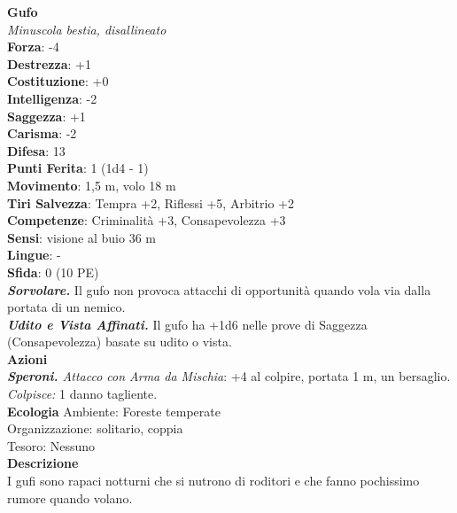 \begin{multicols}{2}
\medskip\textbf{Gufo}\\
\emph{Minuscola bestia, disallineato}\\
\textbf{Forza}: -4\\
\textbf{Destrezza}: +1\\
\textbf{Costituzione}: +0\\
\textbf{Intelligenza}: -2\\
\textbf{Saggezza}: +1\\
\textbf{Carisma}: -2\\
\textbf{Difesa}: 13\\
\textbf{Punti Ferita}: 1 (1d4 - 1)\\
\textbf{Movimento}: 1,5 m, volo 18 m\\
\textbf{Tiri Salvezza}: Tempra +2, Riflessi +5, Arbitrio +2 \\
\textbf{Competenze}: Criminalità +3, Consapevolezza +3\\
\textbf{Sensi}: visione al buio 36 m\\
\textbf{Lingue}: -\\
\textbf{Sfida}: 0 (10 PE)\smallskip\\
\emph{\textbf{Sorvolare.}} Il gufo non provoca attacchi di opportunità quando vola via dalla portata di un nemico.\\
\emph{\textbf{Udito e Vista Affinati.}} Il gufo ha +1d6 nelle prove di Saggezza (Consapevolezza) basate su udito o vista.\\
\smallskip\textbf{Azioni}\\
\emph{\textbf{Speroni.} Attacco con Arma da Mischia}: +4 al colpire, portata 1 m, un bersaglio.\\
\emph{Colpisce:} 1 danno tagliente.\\
\textbf{Ecologia}
Ambiente: Foreste temperate\\
Organizzazione: solitario, coppia\\
Tesoro: Nessuno\\
\textbf{Descrizione}\\
I gufi sono rapaci notturni che si nutrono di roditori e che fanno pochissimo rumore quando volano. \\


\end{multicols}
